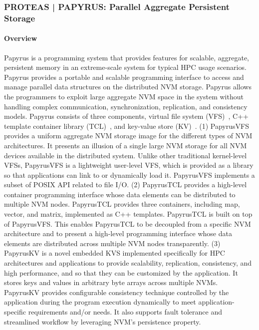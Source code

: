 \subsubsection{ PROTEAS | PAPYRUS: Parallel Aggregate Persistent Storage}\label{s:papyrus}

\paragraph{Overview} 
Papyrus is a programming system that provides features for scalable, aggregate, persistent memory in an extreme-scale system for typical HPC usage scenarios. Papyrus provides a portable and scalable programming interface to access and manage parallel data structures on the distributed NVM storage. Papyrus allows the programmers to exploit large aggregate NVM space in the system without handling complex communication, synchronization, replication, and consistency models. Papyrus consists of three components, virtual file system (VFS)~\cite{Kim:2017:DIP}, C++ template container library (TCL)~\cite{Kim:2017:DIP}, and key-value store (KV)~\cite{Kim:2017:PHP}.
(1) PapyrusVFS provides a uniform aggregate NVM storage image for the different types of NVM architectures. It presents an illusion of a single large NVM storage for all NVM devices available in the distributed system. Unlike other traditional kernel-level VFSs, PapyrusVFS is a lightweight user-level VFS, which is provided as a library so that applications can link to or dynamically load it. PapyrusVFS implements a subset of POSIX API related to file I/O. (2) PapyrusTCL provides a high-level container programming interface whose data elements can be distributed to multiple NVM nodes. PapyrusTCL provides three containers, including map, vector, and matrix, implemented as C++ templates. PapyrusTCL is built on top of PapyrusVFS. This enables PapyrusTCL to be decoupled from a specific NVM architecture and to present a high-level programming interface whose data elements are distributed across multiple NVM nodes transparently. (3) PapyrusKV is a novel embedded KVS implemented specifically for HPC architectures and applications to provide scalability, replication, consistency, and high performance, and so that they can be customized by the application. It stores keys and values in arbitrary byte arrays across multiple NVMs. PapyrusKV provides configurable consistency technique controlled by the application during the program execution dynamically to meet application-specific requirements and/or needs. It also supports fault tolerance and streamlined workflow by leveraging NVM's persistence property.

